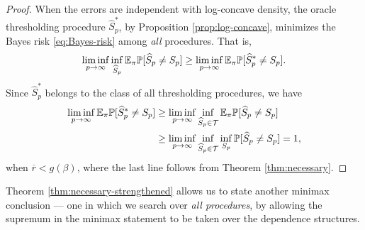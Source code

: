 \begin{proof}%
When the errors are independent with log-concave density, the oracle thresholding procedure $\widehat{S}^*_p$, by Proposition \ref{prop:log-concave}, minimizes the Bayes risk \eqref{eq:Bayes-risk} among \emph{all} procedures. That is,
$$
\liminf_{p\to\infty} \inf_{\widehat{S}_p} {\mathbb E}_\pi{\mathbb P}[\widehat{S}_p\neq S_p]
\ge \liminf_{p\to\infty} {\mathbb E}_\pi{\mathbb P}[\widehat{S}^*_p\neq S_p].
$$
Since $\widehat{S}^*_p$ belongs to the class of all thresholding procedures, we have
\begin{align*}
    \liminf_{p\to\infty} {\mathbb E}_\pi{\mathbb P}[\widehat{S}^*_p\neq S_p] 
    &\ge \liminf_{p\to\infty} \inf_{\widehat{S}_p\in{\cal T}} {\mathbb E}_\pi{\mathbb P}[\widehat{S}_p\neq S_p] \\
    &\ge \liminf_{p\to\infty} \inf_{\widehat{S}_p\in{\cal T}} \inf_{S_p} {\mathbb P}[\widehat{S}_p\neq S_p] = 1,
\end{align*}
when $\overline{r}<g(\beta)$, where the last line follows from Theorem \ref{thm:necessary}.
\end{proof}


Theorem \ref{thm:necessary-strengthened} allows us to state another minimax conclusion --- one in which we search over \emph{all procedures}, by allowing the supremum in the minimax statement to be taken over the dependence structures. 

